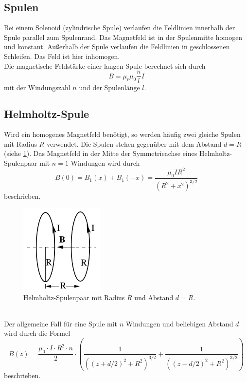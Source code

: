 \subsection{Spulen}
Bei einem Solenoid (zylindrische Spule) verlaufen die Feldlinien innerhalb der Spule parallel zum Spulenrand. Das Magnetfeld ist in der Spulenmitte homogen und konstant.
Außerhalb der Spule verlaufen die Feldlinien in geschlossenen Schleifen. Das Feld ist hier inhomogen.\\
Die magnetische Feldstärke einer langen Spule berechnet sich durch
\begin{equation}
    B = \mu_r \mu_0 \frac{n}{l} I
    \label{eqn:spule}
\end{equation}
mit der Windungszahl $n$ und der Spulenlänge $l$.\\

\subsection{Helmholtz-Spule}
Wird ein homogenes Magnetfeld benötigt, so werden häufig zwei gleiche Spulen mit Radius $R$ verwendet.
Die Spulen stehen gegenüber mit dem Abstand $d=R$ (siehe \ref{fig:helmholtz}). Das Magnetfeld in der Mitte der Symmetrieachse eines Helmholtz-Spulenpaar mit $n=1$ Windungen wird durch
\begin{equation}
    B(0) = B_1(x) + B_1(-x) = \frac{\mu_0 I R^2}{(R^2+x^2)^{3/2}}
\end{equation}
beschrieben.
\begin{figure}
    \centering
    \includegraphics[height=4.5cm]{content/helmholtz.jpg}
    \caption{Helmholtz-Spulenpaar mit Radius $R$ und Abstand $d=R$. \cite[2]{anleitung}}
    \label{fig:helmholtz}
\end{figure}
\\
Der allgemeine Fall für eine Spule mit $n$ Windungen und beliebigen Abstand $d$ wird durch die Formel 
\cite[87--88]{demtroeder}
\begin{equation}
    B(z) = \frac{\mu_0 \cdot I \cdot R^2 \cdot n}{2} \cdot \left ( \frac{1}{\left((z+d/2)^2+R^2\right)^{3/2}} + \frac{1}{\left((z-d/2)^2+R^2\right)^{3/2}} \right )
    \label{eqn:helm}
\end{equation}
beschrieben.


